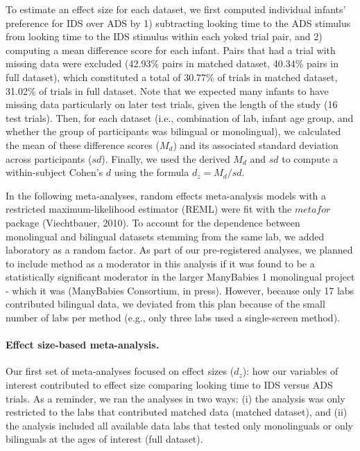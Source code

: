 \documentclass[,man,floatsintext]{apa6}
\let\oldparagraph\paragraph
\renewcommand{\paragraph}[1]{\oldparagraph{#1}\mbox{}}
\begin{document}
To estimate an effect size for each dataset, we first computed individual infants' preference for IDS over ADS by 1) subtracting looking time to the ADS stimulus from looking time to the IDS stimulus within each yoked trial pair, and 2) computing a mean difference score for each infant. Pairs that had a trial with missing data were excluded (42.93\% pairs in matched dataset, 40.34\% pairs in full dataset), which constituted a total of 30.77\% of trials in matched dataset, 31.02\% of trials in full dataset. Note that we expected many infants to have missing data particularly on later test trials, given the length of the study (16 test trials). Then, for each dataset (i.e., combination of lab, infant age group, and whether the group of participants was bilingual or monolingual), we calculated the mean of these difference scores (\(M_d\)) and its associated standard deviation across participants (\(sd\)). Finally, we used the derived \(M_d\) and \(sd\) to compute a within-subject Cohen's \(d\) using the formula \(d_z = M_d/sd\).

In the following meta-analyses, random effects meta-analysis models with a restricted maximum-likelihood estimator (REML) were fit with the \(metafor\) package (Viechtbauer, 2010). To account for the dependence between monolingual and bilingual datasets stemming from the same lab, we added laboratory as a random factor. As part of our pre-registered analyses, we planned to include method as a moderator in this analysis if it was found to be a statistically significant moderator in the larger ManyBabies 1 monolingual project - which it was (ManyBabies Consortium, in press). However, because only 17 labs contributed bilingual data, we deviated from this plan because of the small number of labs per method (e.g., only three labs used a single-screen method).

\hypertarget{effect-size-based-meta-analysis.}{%
\paragraph{Effect size-based meta-analysis.}\label{effect-size-based-meta-analysis.}}

Our first set of meta-analyses focused on effect sizes (\(d_z\)): how our variables of interest contributed to effect size comparing looking time to IDS versus ADS trials. As a reminder, we ran the analyses in two ways: (i) the analysis was only restricted to the labs that contributed matched data (matched dataset), and (ii) the analysis included all available data labs that tested only monolinguals or only bilinguals at the ages of interest (full dataset).
\end{document}
